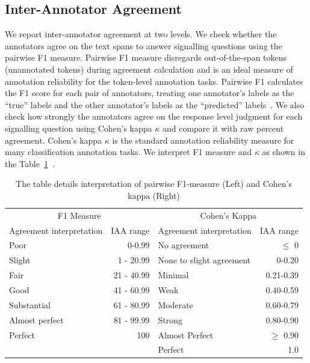 \documentclass[sn-mathphys,Numbered]{sn-jnl}%
\theoremstyle{thmstyleone}%
\theoremstyle{thmstyletwo}%
\theoremstyle{thmstylethree}%
\begin{document}
\subsection{Inter-Annotator Agreement}
\label{method:iaa}
%
We report inter-annotator agreement at two levels. 
We check whether the annotators agree on the text spans to answer signalling questions using the pairwise F1 measure.
Pairwise F1 measure disregards out-of-the-span tokens (unannotated tokens) during agreement calculation and is an ideal measure of annotation reliability for the token-level annotation tasks.
Pairwise F1 calculates the F1 score for each pair of annotators, treating one annotator's labels as the ``true'' labels and the other annotator's labels as the ``predicted'' labels~\cite{deleger2012building,brandsen2020creating}.
We also check how strongly the annotators agree on the response level judgment for each signalling question using Cohen's kappa $\kappa$ and compare it with raw percent agreement.
Cohen's kappa $\kappa$ is the standard annotation reliability measure for many classification annotation tasks.
We interpret F1 measure and $\kappa$ as shown in the Table~\ref{tab:iaa_interpret}~\cite{mchugh2012interrater,cohen1960coefficient,landis1977measurement}.
%
%
%
\begin{center}
 \begin{table}[htb]
   \caption{The table details interpretation of pairwise F1-measure (Left) and Cohen's kappa (Right)}\label{tab:iaa_interpret}
 \centering
    \begin{tabular}{lr|lr}
    \toprule[1.0pt]
    \multicolumn{2}{c|}{F1 Measure} & \multicolumn{2}{c}{Cohen's Kappa}  \\ 
    Agreement interpretation & IAA range & Agreement interpretation & IAA range \\ 
    \midrule[1.0pt]
        Poor & 0-0.99 &  No agreement& $\leq$ 0\\ 
        Slight & 1 - 20.99 &  None to slight agreement & 0-0.20\\ 
        Fair & 21 - 40.99 &  Minimal & 0.21-0.39\\ 
        Good & 41 - 60.99 & Weak & 0.40-0.59\\ 
        Substantial & 61 - 80.99 & Moderate & 0.60-0.79 \\ 
        Almost perfect & 81 - 99.99 & Strong & 0.80-0.90 \\ 
        Perfect & 100 & Almost Perfect & $\geq$ 0.90 \\ 
         & & Perfect & 1.0 \\ 
    \bottomrule[1.0pt]
    \end{tabular}
 \end{table}   
\end{center}
%
%
%
\end{document}
